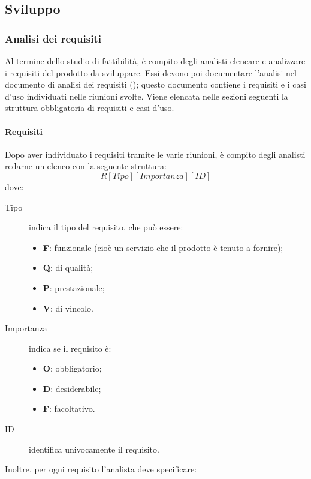 \subsection{Sviluppo}
	\subsubsection{Analisi dei requisiti}
	Al termine dello studio di fattibilità, è compito degli analisti elencare e analizzare i requisiti del prodotto da sviluppare. Essi devono poi documentare l'analisi nel documento di analisi dei requisiti (\AdR); questo documento contiene i requisiti e i casi d'uso individuati nelle riunioni svolte.
	Viene elencata nelle sezioni seguenti la struttura obbligatoria di requisiti e casi d'uso.
		\paragraph{Requisiti} 
		Dopo aver individuato i requisiti tramite le varie riunioni, è compito degli analisti redarne un elenco con la seguente struttura:
			\[R[Tipo][Importanza][ID]\]
		dove:
		\begin{description}
			\item[Tipo] indica il tipo del requisito, che può essere:
				\begin{itemize}
					\item \textbf{F}: funzionale (cioè un servizio che il prodotto è tenuto a fornire);
					\item \textbf{Q}: di qualità;
					\item \textbf{P}: prestazionale;
					\item \textbf{V}: di vincolo.
			\end{itemize}
			\item[Importanza] indica se il requisito è:
			\begin{itemize}
				\item \textbf{O}: obbligatorio;
				\item \textbf{D}: desiderabile;
				\item \textbf{F}: facoltativo. 
			\end{itemize}
			
			\item[ID] identifica univocamente il requisito.
		\end{description}
		Inoltre, per ogni requisito l'analista deve specificare:
